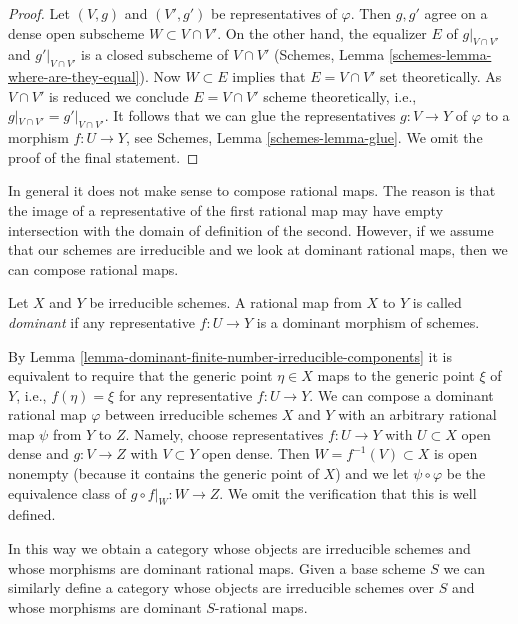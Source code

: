 \begin{proof}
Let $(V, g)$ and $(V', g')$ be representatives of $\varphi$. Then
$g, g'$ agree on a dense open subscheme $W \subset V \cap V'$.
On the other hand, the equalizer $E$ of $g|_{V \cap V'}$ and $g'|_{V \cap V'}$
is a closed subscheme of $V \cap V'$ (Schemes, Lemma
\ref{schemes-lemma-where-are-they-equal}). Now $W \subset E$
implies that $E = V \cap V'$ set theoretically. As $V \cap V'$
is reduced we conclude $E = V \cap V'$ scheme theoretically, i.e.,
$g|_{V \cap V'} = g'|_{V \cap V'}$. It follows that we can glue the
representatives $g : V \to Y$ of $\varphi$ to a morphism $f : U \to Y$, see
Schemes, Lemma \ref{schemes-lemma-glue}.
We omit the proof of the final statement.
\end{proof}

\noindent
In general it does not make sense to compose rational maps. The reason
is that the image of a representative of the first rational map may
have empty intersection with the domain of definition of the second.
However, if we assume that our schemes are irreducible and we look
at dominant rational maps, then we can compose rational maps.

\begin{definition}
\label{definition-dominant-rational}
Let $X$ and $Y$ be irreducible schemes. A rational map from $X$ to $Y$
is called {\it dominant} if any representative $f : U \to Y$ is a dominant
morphism of schemes.
\end{definition}

\noindent
By Lemma \ref{lemma-dominant-finite-number-irreducible-components}
it is equivalent to require that the generic point $\eta \in X$
maps to the generic point $\xi$ of $Y$, i.e., $f(\eta) = \xi$ for
any representative $f : U \to Y$. We can compose a dominant rational map
$\varphi$ between irreducible schemes $X$ and $Y$ with an arbitrary rational
map $\psi$ from $Y$ to $Z$. Namely, choose
representatives $f : U \to Y$ with $U \subset X$ open dense
and $g : V \to Z$ with $V \subset Y$ open dense. Then
$W = f^{-1}(V) \subset X$ is open nonempty (because it contains the
generic point of $X$) and we let $\psi \circ \varphi$ be the
equivalence class of $g \circ f|_W : W \to Z$. We omit the verification
that this is well defined.

\medskip\noindent
In this way we obtain a category whose objects are irreducible schemes
and whose morphisms are dominant rational maps. Given a base scheme
$S$ we can similarly define a category whose objects are irreducible schemes
over $S$ and whose morphisms are dominant $S$-rational maps.

